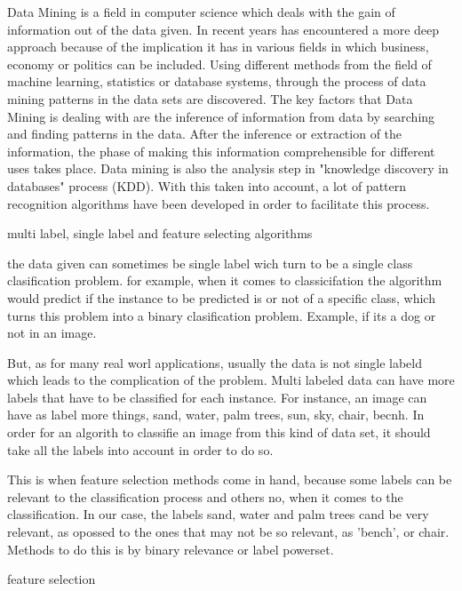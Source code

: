 
Data Mining is a field in computer science which deals with the gain of information out of the data given. 
In recent years has encountered a more deep approach because of the implication it has in various fields in which business, economy or politics can be included\cite{economist}.
Using different methods from the field of machine learning, statistics or database systems, through the process of data mining patterns in the data sets are discovered.
The key factors that Data Mining is dealing with are the inference of information from data by searching and finding patterns in the data. After the inference or extraction of the information, the phase of making this information comprehensible for different uses takes place\cite{datamining}. Data mining is also the analysis step in "knowledge discovery in databases" process (KDD)\cite{KDD}.
With this taken into account, a lot of pattern recognition algorithms have been developed in order to facilitate this process\cite{Witten:2011:DMP:1972514}.

multi label, single label and feature selecting algorithms

the data given can sometimes be single label wich turn to be a single class clasification problem. for example, when it comes to classicifation the algorithm would predict if the instance to be predicted is or not of a specific class, which turns this problem into a binary clasification problem. Example, if its a dog or not in an image.

But, as for many real worl applications, usually the data is not single labeld which leads to the complication of the problem. Multi labeled data can have more labels that have to be classified for each instance. For instance, an image can have as label more things, sand, water, palm trees, sun, sky, chair, becnh. In order for an algorith to classifie an image from this kind of data set, it should take all the labels into account in order to do so.

This is when feature selection methods come in hand, because some labels can be relevant to the classification process and others no, when it comes to the classification. In our case, the labels sand, water and palm trees cand be very relevant, as opossed to the ones that may not be so relevant, as 'bench', or chair. Methods to do this is by binary relevance or label powerset.

feature selection





